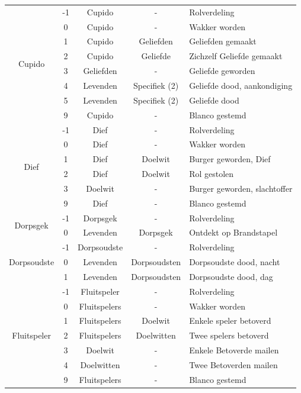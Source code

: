 \documentclass[12pt]{article}
\begin{document}
\begin{center}
\begin{longtable}{c|c|c|c|l}
      \hline
      \multirow{8}{*}{Cupido} & -1 & Cupido & - & Rolverdeling \\
       & 0 & Cupido & - & Wakker worden \\
       & 1 & Cupido & Geliefden & Geliefden gemaakt \\
       & 2 & Cupido & Geliefde & Zichzelf Geliefde gemaakt \\
       & 3 & Geliefden & - & Geliefde geworden \\
       & 4 & Levenden & Specifiek (2) & Geliefde dood, aankondiging \\
       & 5 & Levenden & Specifiek (2) & Geliefde dood \\
       & 9 & Cupido & - & Blanco gestemd \\
      \hline
      \multirow{6}{*}{Dief} & -1 & Dief & - & Rolverdeling \\
       & 0 & Dief & - & Wakker worden \\
       & 1 & Dief & Doelwit & Burger geworden, Dief \\
       & 2 & Dief & Doelwit & Rol gestolen \\
       & 3 & Doelwit & - & Burger geworden, slachtoffer \\
       & 9 & Dief & - & Blanco gestemd \\
      \hline
      \multirow{2}{*}{Dorpsgek} & -1 & Dorpsgek & - & Rolverdeling \\
       & 0 & Levenden & Dorpsgek & Ontdekt op Brandstapel \\
      \hline
      \multirow{3}{*}{Dorpsoudste} & -1 & Dorpsoudste & - & Rolverdeling \\
       & 0 & Levenden & Dorpsoudsten & Dorpsoudste dood, nacht \\
       & 1 & Levenden & Dorpsoudsten & Dorpsoudste dood, dag \\
      \hline
      \multirow{7}{*}{Fluitspeler} & -1 & Fluitspeler & - & Rolverdeling \\
       & 0 & Fluitspelers & - & Wakker worden \\
       & 1 & Fluitspelers & Doelwit & Enkele speler betoverd \\
       & 2 & Fluitspelers & Doelwitten & Twee spelers betoverd \\
       & 3 & Doelwit & - & Enkele Betoverde mailen \\
       & 4 & Doelwitten & - & Twee Betoverden mailen \\
       & 9 & Fluitspelers & - & Blanco gestemd \\

\end{longtable}
\end{center}
\end{document}
